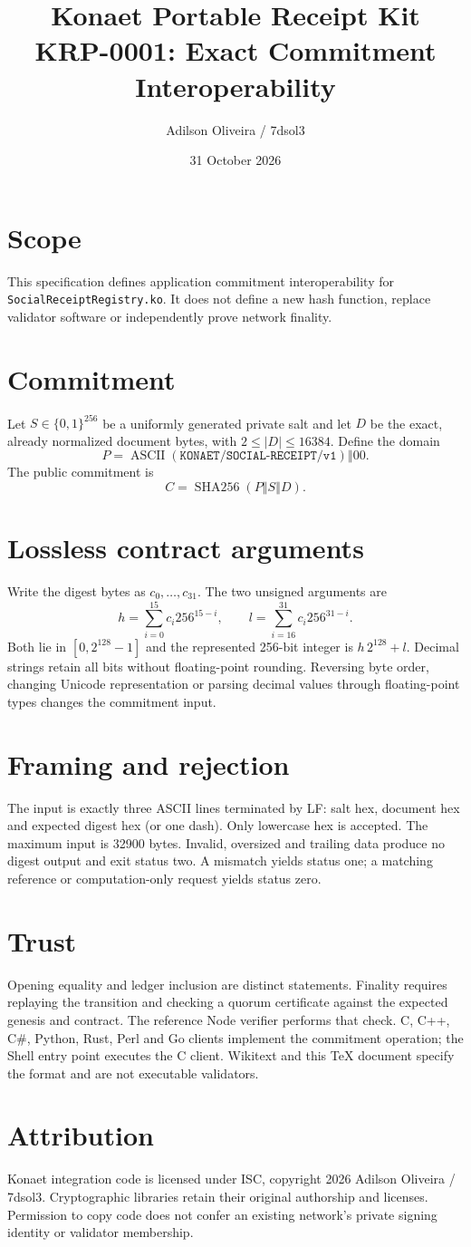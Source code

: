 \documentclass[11pt]{article}
\title{Konaet Portable Receipt Kit\\KRP-0001: Exact Commitment Interoperability}
\author{Adilson Oliveira / 7dsol3}
\date{31 October 2026}
\begin{document}
\maketitle
\section{Scope}
This specification defines application commitment interoperability for
\texttt{SocialReceiptRegistry.ko}. It does not define a new hash function,
replace validator software or independently prove network finality.
\section{Commitment}
Let $S\in\{0,1\}^{256}$ be a uniformly generated private salt and let
$D$ be the exact, already normalized document bytes, with
$2\leq |D|\leq 16384$. Define the domain
\[
 P=\operatorname{ASCII}(\texttt{KONAET/SOCIAL-RECEIPT/v1})\mathbin\Vert 00.
\]
The public commitment is
\[
 C=\operatorname{SHA256}(P\mathbin\Vert S\mathbin\Vert D).
\]
\section{Lossless contract arguments}
Write the digest bytes as $c_0,\ldots,c_{31}$. The two unsigned arguments are
\[
 h=\sum_{i=0}^{15}c_i256^{15-i},\qquad
 l=\sum_{i=16}^{31}c_i256^{31-i}.
\]
Both lie in $[0,2^{128}-1]$ and the represented 256-bit integer is
$h\,2^{128}+l$. Decimal strings retain all bits without floating-point
rounding. Reversing byte order, changing Unicode representation or parsing
decimal values through floating-point types changes the commitment input.
\section{Framing and rejection}
The input is exactly three ASCII lines terminated by LF: salt hex, document
hex and expected digest hex (or one dash). Only lowercase hex is accepted.
The maximum input is 32900 bytes. Invalid, oversized and trailing data
produce no digest output and exit status two. A mismatch yields status one;
a matching reference or computation-only request yields status zero.
\section{Trust}
Opening equality and ledger inclusion are distinct statements. Finality
requires replaying the transition and checking a quorum certificate against
the expected genesis and contract. The reference Node verifier performs that
check. C, C++, C\#, Python, Rust, Perl and Go clients implement the commitment
operation; the Shell entry point executes the C client. Wikitext and this
TeX document specify the format and are not executable validators.
\section{Attribution}
Konaet integration code is licensed under ISC, copyright 2026 Adilson
Oliveira / 7dsol3. Cryptographic libraries retain their original authorship
and licenses. Permission to copy code does not confer an existing network's
private signing identity or validator membership.
\end{document}
